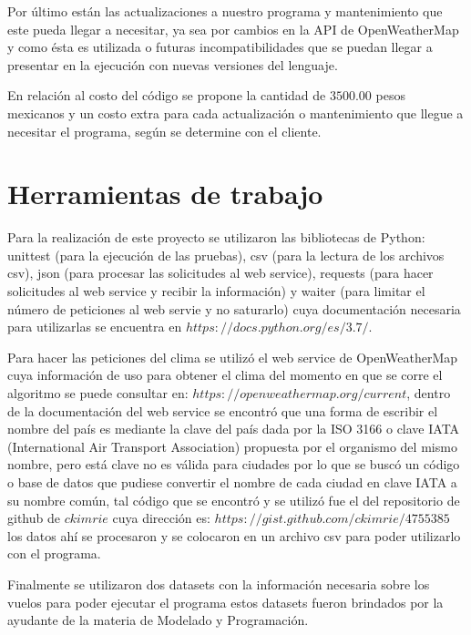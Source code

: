 \documentclass[]{article}
\begin{document}
Por último están las actualizaciones a nuestro programa y mantenimiento que este pueda llegar a necesitar, ya sea por cambios en la API de OpenWeatherMap y como ésta es utilizada o futuras incompatibilidades que se puedan llegar a presentar en la ejecución con nuevas versiones del lenguaje.

En relación al costo del código se propone la cantidad de $ 3500.00 $ pesos mexicanos y un costo extra para cada actualización o mantenimiento que llegue a necesitar el programa, según se determine con el cliente.

\section{Herramientas de trabajo}
Para la realización de este proyecto se utilizaron las bibliotecas de Python: unittest (para la ejecución de las pruebas), csv (para la lectura de los archivos csv), json (para procesar las solicitudes al web service), requests (para hacer solicitudes al web service y recibir la información) y waiter (para limitar el número de peticiones al web servie y no saturarlo) cuya documentación necesaria para utilizarlas se encuentra en $ https://docs.python.org/es/3.7/ $.

Para hacer las peticiones del clima se utilizó el web service de OpenWeatherMap cuya información de uso para obtener el clima del momento en que se corre el algoritmo se puede consultar en: $ https://openweathermap.org/current $, dentro de la documentación del web service se encontró que una forma de escribir el nombre del país es mediante la clave del país dada por la ISO 3166 o clave IATA (International Air Transport Association) propuesta por el organismo del mismo nombre, pero está clave no es válida para ciudades por lo que se buscó un código o base de datos que pudiese convertir el nombre de cada ciudad en clave IATA a su nombre común, tal código que se encontró y se utilizó fue el del repositorio de github de $ ckimrie $ cuya dirección es: $ https://gist.github.com/ckimrie/4755385 $ los datos ahí se procesaron y se colocaron en un archivo csv para poder utilizarlo con el programa.

Finalmente se utilizaron dos datasets con la información necesaria sobre los vuelos para poder ejecutar el programa estos datasets fueron brindados por la ayudante de la materia de Modelado y Programación.
\end{document}
